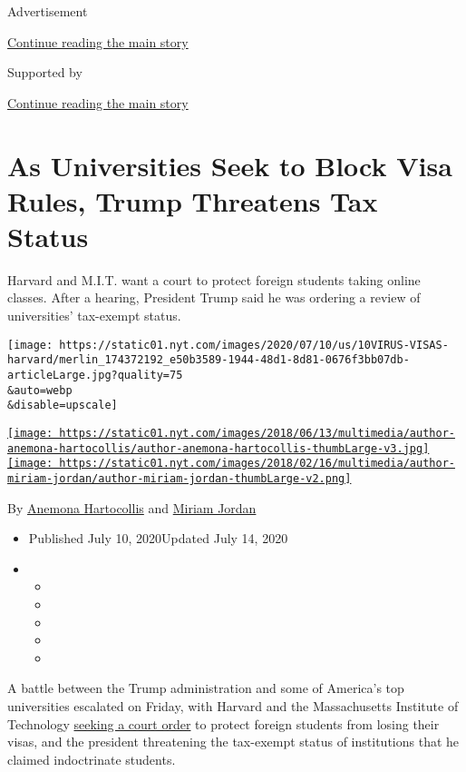 Advertisement

\protect\hyperlink{after-top}{Continue reading the main story}

Supported by

\protect\hyperlink{after-sponsor}{Continue reading the main story}

\hypertarget{as-universities-seek-to-block-visa-rules-trump-threatens-tax-status}{%
\section{As Universities Seek to Block Visa Rules, Trump Threatens Tax
Status}\label{as-universities-seek-to-block-visa-rules-trump-threatens-tax-status}}

Harvard and M.I.T. want a court to protect foreign students taking
online classes. After a hearing, President Trump said he was ordering a
review of universities' tax-exempt status.

\texttt{[image: https://static01.nyt.com/images/2020/07/10/us/10VIRUS-VISAS-harvard/merlin\_174372192\_e50b3589-1944-48d1-8d81-0676f3bb07db-articleLarge.jpg?quality=75\\\&auto=webp\\\&disable=upscale]}

\href{https://www.nytimes.com/by/anemona-hartocollis}{\texttt{[image: https://static01.nyt.com/images/2018/06/13/multimedia/author-anemona-hartocollis/author-anemona-hartocollis-thumbLarge-v3.jpg]}}\href{https://www.nytimes.com/by/miriam-jordan/}{\texttt{[image: https://static01.nyt.com/images/2018/02/16/multimedia/author-miriam-jordan/author-miriam-jordan-thumbLarge-v2.png]}}

By \href{https://www.nytimes.com/by/anemona-hartocollis}{Anemona
Hartocollis} and \href{https://www.nytimes.com/by/miriam-jordan/}{Miriam
Jordan}

\begin{itemize}
\item
  Published July 10, 2020Updated July 14, 2020
\item
  \begin{itemize}
  \item
  \item
  \item
  \item
  \item
  \end{itemize}
\end{itemize}

A battle between the Trump administration and some of America's top
universities escalated on Friday, with Harvard and the Massachusetts
Institute of Technology
\href{https://www.nytimes.com/2020/07/08/us/harvard-mit-trump-ice-students.html}{seeking
a court order} to protect foreign students from losing their visas, and
the president threatening the tax-exempt status of institutions that he
claimed indoctrinate students.

